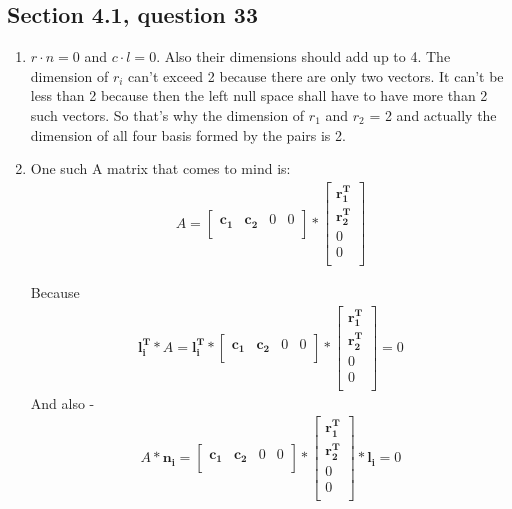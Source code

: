 \documentclass[a4paper,11pt]{article}
\newcommand{\mybf}[1]{\boldsymbol{#1}}
\begin{document}
\subsection*{Section 4.1, question 33}
\begin {enumerate} [label=\alph*]
\item $r \cdot n = 0$ and $c \cdot l = 0$. Also their dimensions should add up to 4. The dimension of ${r_i}$ can't exceed 2 because there are only two vectors. It can't be less than 2 because then the left null space shall have to have more than 2 such vectors. So that's why the dimension of $r_1$ and $r_2$ = 2 and actually the dimension of all four basis formed by the pairs is 2.
\item One such A matrix that comes to mind is:
\begin{align*}
A =
\begin{bmatrix}
\mybf{c_1} & \mybf{c_2} & 0 & 0 \\
\end{bmatrix}
*
\begin{bmatrix}
\mybf{r_1^T}  \\
\mybf{r_2^T}  \\
0 \\
0 \\
\end{bmatrix}
\end{align*}

Because
\begin{align*}
\mybf{l_i^T}*A =
\mybf{l_i^T} *
\begin{bmatrix}
\mybf{c_1} & \mybf{c_2} & 0 & 0 \\
\end{bmatrix}
*
\begin{bmatrix}
\mybf{r_1^T}  \\
\mybf{r_2^T}  \\
0 \\
0 \\
\end{bmatrix}
= 0
\end{align*}
And also - 
\begin{align*}
A * \mybf{n_i}=
\begin{bmatrix}
\mybf{c_1} & \mybf{c_2} & 0 & 0 \\
\end{bmatrix}
*
\begin{bmatrix}
\mybf{r_1^T}  \\
\mybf{r_2^T}  \\
0 \\
0 \\
\end{bmatrix}
*
\mybf{l_i}
= 0
\end{align*}
\end {enumerate}
\end{document}
